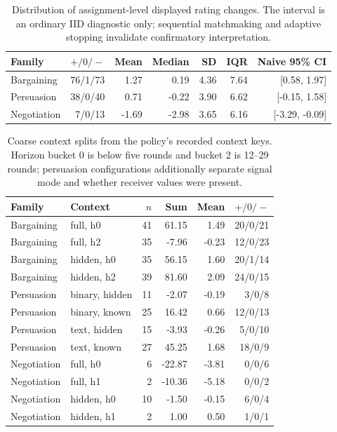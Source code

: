 \begin{table}[t]
\caption{Distribution of assignment-level displayed rating changes. The interval is an ordinary IID diagnostic only; sequential matchmaking and adaptive stopping invalidate confirmatory interpretation.}
\label{tab:v33-distribution}
\centering\scriptsize
\begin{tabular}{lrrrrrr}
\toprule
Family & $+ / 0 / -$ & Mean & Median & SD & IQR & Naive 95\% CI \\
\midrule
Bargaining & 76/1/73 & 1.27 & 0.19 & 4.36 & 7.64 & [0.58, 1.97] \\
Persuasion & 38/0/40 & 0.71 & -0.22 & 3.90 & 6.62 & [-0.15, 1.58] \\
Negotiation & 7/0/13 & -1.69 & -2.98 & 3.65 & 6.16 & [-3.29, -0.09] \\
\bottomrule
\end{tabular}
\end{table}

\begin{table}[t]
\caption{Coarse context splits from the policy's recorded context keys. Horizon bucket 0 is below five rounds and bucket 2 is 12--29 rounds; persuasion configurations additionally separate signal mode and whether receiver values were present.}
\label{tab:v33-context-distribution}
\centering\scriptsize
\begin{tabular}{llrrrr}
\toprule
Family & Context & $n$ & Sum & Mean & $+ / 0 / -$ \\
\midrule
Bargaining & full, h0 & 41 & 61.15 & 1.49 & 20/0/21 \\
Bargaining & full, h2 & 35 & -7.96 & -0.23 & 12/0/23 \\
Bargaining & hidden, h0 & 35 & 56.15 & 1.60 & 20/1/14 \\
Bargaining & hidden, h2 & 39 & 81.60 & 2.09 & 24/0/15 \\
Persuasion & binary, hidden & 11 & -2.07 & -0.19 & 3/0/8 \\
Persuasion & binary, known & 25 & 16.42 & 0.66 & 12/0/13 \\
Persuasion & text, hidden & 15 & -3.93 & -0.26 & 5/0/10 \\
Persuasion & text, known & 27 & 45.25 & 1.68 & 18/0/9 \\
Negotiation & full, h0 & 6 & -22.87 & -3.81 & 0/0/6 \\
Negotiation & full, h1 & 2 & -10.36 & -5.18 & 0/0/2 \\
Negotiation & hidden, h0 & 10 & -1.50 & -0.15 & 6/0/4 \\
Negotiation & hidden, h1 & 2 & 1.00 & 0.50 & 1/0/1 \\
\bottomrule
\end{tabular}
\end{table}

